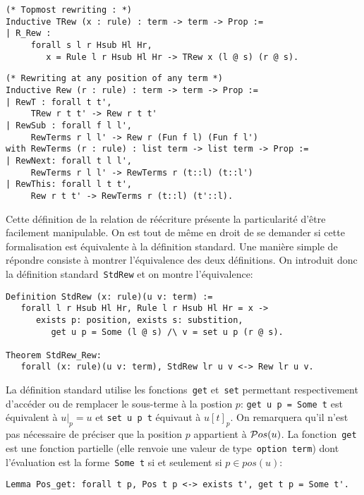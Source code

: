 \begin{lstlisting}
(* Topmost rewriting : *)
Inductive TRew (x : rule) : term -> term -> Prop :=
| R_Rew :
     forall s l r Hsub Hl Hr,
        x = Rule l r Hsub Hl Hr -> TRew x (l @ s) (r @ s).
\end{lstlisting}


\begin{lstlisting}
(* Rewriting at any position of any term *)
Inductive Rew (r : rule) : term -> term -> Prop :=
| RewT : forall t t', 
     TRew r t t' -> Rew r t t'
| RewSub : forall f l l', 
     RewTerms r l l' -> Rew r (Fun f l) (Fun f l')
with RewTerms (r : rule) : list term -> list term -> Prop :=
| RewNext: forall t l l',
     RewTerms r l l' -> RewTerms r (t::l) (t::l')
| RewThis: forall l t t',
     Rew r t t' -> RewTerms r (t::l) (t'::l).
\end{lstlisting}



Cette définition de la relation de réécriture présente la particularité
d'être facilement manipulable. On est tout de même en droit de se demander si cette
formalisation est équivalente à la définition standard. Une manière simple de répondre
consiste à montrer l'équivalence des deux définitions. On introduit donc la définition standard~\lstinline!StdRew!
et on montre l'équivalence:

\begin{lstlisting}
Definition StdRew (x: rule)(u v: term) := 
   forall l r Hsub Hl Hr, Rule l r Hsub Hl Hr = x ->
      exists p: position, exists s: substition, 
         get u p = Some (l @ s) /\ v = set u p (r @ s).

Theorem StdRew_Rew:
   forall (x: rule)(u v: term), StdRew lr u v <-> Rew lr u v.
\end{lstlisting}

La définition standard utilise les fonctions~\lstinline!get! et~\lstinline!set!
permettant respectivement d'accéder ou de remplacer le sous-terme à la postion $p$:
\lstinline!get u p = Some t! est équivalent à $u|_p = u$ et \lstinline!set u p t! équivaut à $u[t]_p$.
On remarquera qu'il n'est pas nécessaire de préciser que la position $p$ appartient à $\mathcal{ P}os(u)$.
La fonction~\lstinline!get! est une fonction partielle (elle renvoie une valeur de type~\lstinline!option term!)
dont l'évaluation est la forme~\lstinline!Some t! si et seulement si $p \in pos(u)$:
\begin{lstlisting}
Lemma Pos_get: forall t p, Pos t p <-> exists t', get t p = Some t'.
\end{lstlisting}


